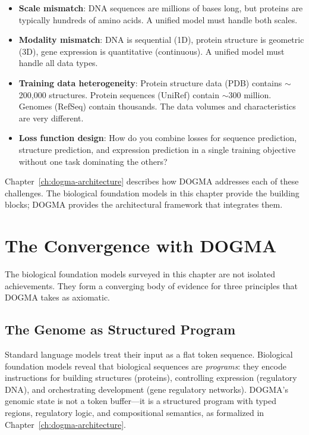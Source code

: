 \begin{itemize}[leftmargin=1.5em]
  \item \textbf{Scale mismatch}: DNA sequences are millions of bases long, but proteins are typically hundreds of amino acids. A unified model must handle both scales.
  \item \textbf{Modality mismatch}: DNA is sequential (1D), protein structure is geometric (3D), gene expression is quantitative (continuous). A unified model must handle all data types.
  \item \textbf{Training data heterogeneity}: Protein structure data (PDB) contains $\sim$200{,}000 structures. Protein sequences (UniRef) contain $\sim$300 million. Genomes (RefSeq) contain thousands. The data volumes and characteristics are very different.
  \item \textbf{Loss function design}: How do you combine losses for sequence prediction, structure prediction, and expression prediction in a single training objective without one task dominating the others?
\end{itemize}

Chapter~\ref{ch:dogma-architecture} describes how DOGMA addresses each of these challenges. The biological foundation models in this chapter provide the building blocks; DOGMA provides the architectural framework that integrates them.

\section{The Convergence with DOGMA}
\label{sec:convergence-dogma}

The biological foundation models surveyed in this chapter are not isolated achievements. They form a converging body of evidence for three principles that DOGMA takes as axiomatic.

\subsection{The Genome as Structured Program}

Standard language models treat their input as a flat token sequence. Biological foundation models reveal that biological sequences are \emph{programs}: they encode instructions for building structures (proteins), controlling expression (regulatory DNA), and orchestrating development (gene regulatory networks). DOGMA's genomic state is not a token buffer---it is a structured program with typed regions, regulatory logic, and compositional semantics, as formalized in Chapter~\ref{ch:dogma-architecture}.

